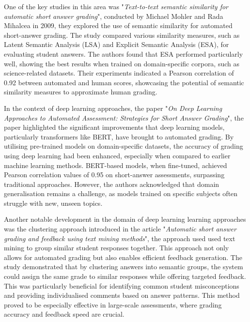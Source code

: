 \documentclass[a4paper,10pt]{article}
\begin{document}
One of the key studies in this area was "\textit{Text-to-text semantic similarity for automatic short answer grading}", conducted by Michael Mohler and Rada Mihalcea in 2009, they explored the use of semantic similarity for automated short-answer grading\cite{mohler2009text}. The study compared various similarity measures, such as Latent Semantic Analysis (LSA) and Explicit Semantic Analysis (ESA), for evaluating student answers\cite{mohler2009text}. The authors found that ESA performed particularly well, showing the best results when trained on domain-specific corpora, such as science-related datasets\cite{mohler2009text}. Their experiments indicated a Pearson correlation of 0.92 between automated and human scores, showcasing the potential of semantic similarity measures to approximate human grading\cite{mohler2009text}.\newline\newline

In the context of deep learning approaches, the paper "\textit{On Deep Learning Approaches to Automated Assessment: Strategies for Short Answer Grading}", the paper highlighted the significant improvements that deep learning models, particularly transformers like BERT, have brought to automated grading\cite{ahmed2022deep}. By utilising pre-trained models on domain-specific datasets, the accuracy of grading using deep learning had been enhanced, especially when compared to earlier machine learning methods\cite{ahmed2022deep}. BERT-based models, when fine-tuned, achieved Pearson correlation values of 0.95 on short-answer assessments, surpassing traditional approaches\cite{ahmed2022deep}. However, the authors acknowledged that domain generalisation remains a challenge, as models trained on specific subjects often struggle with new, unseen topics\cite{ahmed2022deep}.\newline\newline

Another notable development in the domain of deep learning learning approaches was the clustering approach introduced in the article "\textit{Automatic short answer grading and feedback using text mining methods}", the approach used used text mining to group similar student responses together\cite{suzen2020automatic}. This approach not only allows for automated grading but also enables efficient feedback generation. The study demonstrated that by clustering answers into semantic groups, the system could assign the same grade to similar responses while offering targeted feedback\cite{suzen2020automatic}. This was particularly beneficial for identifying common student misconceptions and providing individualised comments based on answer patterns\cite{suzen2020automatic}. This method proved to be especially effective in large-scale assessments, where grading accuracy and feedback speed are crucial\cite{suzen2020automatic}.\newline\newline
\end{document}
